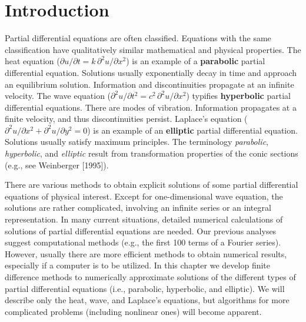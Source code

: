 \section{Introduction}
\label{sec:fd-intro}

Partial differential equations are often classified.  Equations with the same classification have qualitatively similar mathematical and physical properties.  The heat equation ($\partial u/\partial t = k\,\partial^2 u/\partial x^2$) is an example of a \textbf{parabolic} partial differential equation.  Solutions usually exponentially decay in time and approach an equilibrium solution.  Information and discontinuities propagate at an infinite velocity.  The wave equation ($\partial^2 u/\partial t^2 = c^2\,\partial^2 u/\partial x^2$) typifies \textbf{hyperbolic} partial differential equations.  There are modes of vibration.  Information propagates at a finite velocity, and thus discontinuities persist.  Laplace's equation ($\partial^2 u/\partial x^2 + \partial^2 u/\partial y^2 = 0$) is an example of an \textbf{elliptic} partial differential equation.  Solutions usually satisfy maximum principles.  The terminology \emph{parabolic}, \emph{hyperbolic}, and \emph{elliptic} result from transformation properties of the conic sections (e.g., see Weinberger [1995]).

There are various methods to obtain explicit solutions of some partial differential equations of physical interest.  Except for one-dimensional wave equation, the solutions are rather complicated, involving an infinite series or an integral representation.  In many current situations, detailed numerical calculations of solutions of partial differential equations are needed.  Our previous analyses suggest computational methods (e.g., the first 100 terms of a Fourier series).  However, usually there are more efficient methods to obtain numerical results, especially if a computer is to be utilized.  In this chapter we develop finite difference methods to numerically approximate solutions of the different types of partial differential equations (i.e., parabolic, hyperbolic, and elliptic).  We will describe only the heat, wave, and Laplace's equations, but algorithms for more complicated problems (including nonlinear ones) will become apparent.
